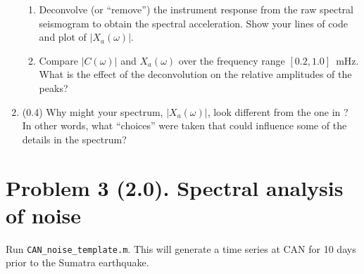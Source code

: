 \documentclass[11pt,titlepage,fleqn]{article}
\begin{document}
\begin{enumerate}
\begin{enumerate}
\item Deconvolve (or ``remove'') the instrument response from the raw spectral seismogram to obtain the spectral acceleration. Show your lines of code and plot of $|X_a(\omega)|$.
\item Compare $|C(\omega)|$ and $X_a(\omega)$ over the frequency range $[0.2,1.0]$~mHz. What is the effect of the deconvolution on the relative amplitudes of the peaks?
\end{enumerate}


\item (0.4) Why might your spectrum, $|X_a(\omega)|$, look different from the one in \citet{Park2005}? In other words, what ``choices'' were taken that could influence some of the details in the spectrum?

\end{enumerate}


\pagebreak
\section*{Problem 3 (2.0). Spectral analysis of noise}

Run \verb+CAN_noise_template.m+. This will generate a time series at CAN for 10 days prior to the Sumatra earthquake.
\end{document}
